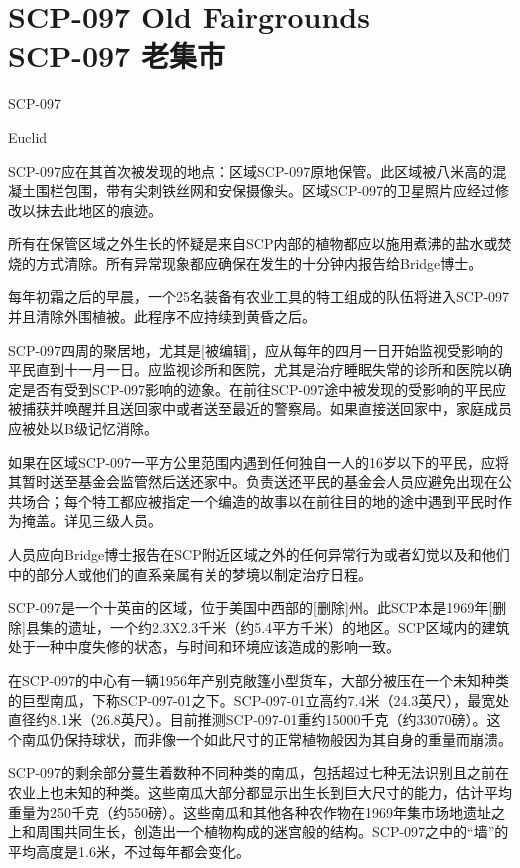 \chapter[SCP-097 老集市]{
    SCP-097 Old Fairgrounds\\
    SCP-097 老集市
}

\label{chap:SCP-097}

SCP-097

Euclid

SCP-097应在其首次被发现的地点：区域SCP-097原地保管。此区域被八米高的混凝土围栏包围，带有尖刺铁丝网和安保摄像头。区域SCP-097的卫星照片应经过修改以抹去此地区的痕迹。

所有在保管区域之外生长的怀疑是来自SCP内部的植物都应以施用煮沸的盐水或焚烧的方式清除。所有异常现象都应确保在发生的十分钟内报告给Bridge博士。

每年初霜之后的早晨，一个25名装备有农业工具的特工组成的队伍将进入SCP-097并且清除外围植被。此程序不应持续到黄昏之后。

SCP-097四周的聚居地，尤其是{[}被编辑]，应从每年的四月一日开始监视受影响的平民直到十一月一日。应监视诊所和医院，尤其是治疗睡眠失常的诊所和医院以确定是否有受到SCP-097影响的迹象。在前往SCP-097途中被发现的受影响的平民应被捕获并唤醒并且送回家中或者送至最近的警察局。如果直接送回家中，家庭成员应被处以B级记忆消除。

如果在区域SCP-097一平方公里范围内遇到任何独自一人的16岁以下的平民，应将其暂时送至基金会监管然后送还家中。负责送还平民的基金会人员应避免出现在公共场合；每个特工都应被指定一个编造的故事以在前往目的地的途中遇到平民时作为掩盖。详见三级人员。

人员应向Bridge博士报告在SCP附近区域之外的任何异常行为或者幻觉以及和他们中的部分人或他们的直系亲属有关的梦境以制定治疗日程。

SCP-097是一个十英亩的区域，位于美国中西部的{[}删除]州。此SCP本是1969年{[}删除]县集的遗址，一个约2.3X2.3千米（约5.4平方千米）的地区。SCP区域内的建筑处于一种中度失修的状态，与时间和环境应该造成的影响一致。

在SCP-097的中心有一辆1956年产别克敞篷小型货车，大部分被压在一个未知种类的巨型南瓜，下称SCP-097-01之下。SCP-097-01立高约7.4米（24.3英尺），最宽处直径约8.1米（26.8英尺）。目前推测SCP-097-01重约15000千克（约33070磅）。这个南瓜仍保持球状，而非像一个如此尺寸的正常植物般因为其自身的重量而崩溃。

SCP-097的剩余部分蔓生着数种不同种类的南瓜，包括超过七种无法识别且之前在农业上也未知的种类。这些南瓜大部分都显示出生长到巨大尺寸的能力，估计平均重量为250千克（约550磅）。这些南瓜和其他各种农作物在1969年集市场地遗址之上和周围共同生长，创造出一个植物构成的迷宫般的结构。SCP-097之中的“墙”的平均高度是1.6米，不过每年都会变化。


